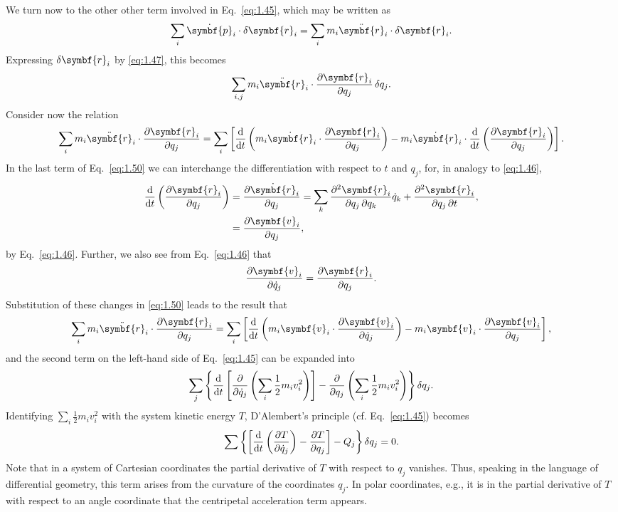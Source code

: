 We turn now to the other other term involved in Eq.~\eqref{eq:1.45}, which may be written as
\begin{equation*}
    \sum_i\dot{\symbf{p}}_i\cdot\fdif{\symbf{r}_i}=\sum_im_i\ddot{\symbf{r}}_i\cdot\fdif{\symbf{r}_i}.
\end{equation*}
Expressing \(\fdif{\symbf{r}_i}\) by \eqref{eq:1.47}, this becomes
\begin{equation*}
    \sum_{i,j}m_i\ddot{\symbf{r}}_i\cdot\pdv{\symbf{r}_i}{q_j}\fdif{q_j}.
\end{equation*}
Consider now the relation
\begin{equation}
    \sum_im_i\ddot{\symbf{r}}_i\cdot\pdv{\symbf{r}_i}{q_j}=\sum_i\left[\odv*{\left(m_i\dot{\symbf{r}}_i\cdot\pdv{\symbf{r}_i}{q_j}\right)}{t}-m_i\dot{\symbf{r}}_i\cdot\odv*{\left(\pdv{\symbf{r}_i}{q_j}\right)}{t}\right].\label{eq:1.50}
\end{equation}
In the last term of Eq.~\eqref{eq:1.50} we can interchange the differentiation with respect to \(t\) and \(q_j\), for, in analogy to \eqref{eq:1.46},
\begin{equation*}
    \begin{aligned}
        \odv*{\left(\pdv{\symbf{r}_i}{q_j}\right)}{t}&=\pdv{\dot{\symbf{r}}_i}{q_j}=\sum_k\pdv{\symbf{r}_i}{q_j,q_k}\dot{q}_k+\pdv{\symbf{r}_i}{q_j,t},\\
        &=\pdv{\symbf{v}_i}{q_j},
    \end{aligned}
\end{equation*}
by Eq.~\eqref{eq:1.46}. Further, we also see from Eq.~\eqref{eq:1.46} that
\begin{equation}
    \pdv{\symbf{v}_i}{\dot{q}_j}=\pdv{\symbf{r}_i}{q_j}.
\end{equation}
Substitution of these changes in \eqref{eq:1.50} leads to the result that
\begin{equation*}
    \sum_im_i\ddot{\symbf{r}}_i\cdot\pdv{\symbf{r}_i}{q_j}=\sum_i\left[\odv*{\left(m_i\symbf{v}_i\cdot\pdv{\symbf{v}_i}{\dot{q}_j}\right)}{t}-m_i\symbf{v}_i\cdot\pdv{\symbf{v}_i}{q_j}\right],
\end{equation*}
and the second term on the left-hand side of Eq.~\eqref{eq:1.45} can be expanded into
\begin{equation*}
    \sum_j\left\{\odv*{\left[\pdv*{\left(\sum_i\frac{1}{2}m_iv_i^2\right)}{\dot{q}_j}\right]}{t}-\pdv*{\left(\sum_i\frac{1}{2}m_iv_i^2\right)}{q_j}\right\}\fdif{q_j}.
\end{equation*}
Identifying \(\sum_i\frac{1}{2}m_iv_i^2\) with the system kinetic energy \(T\), D'Alembert's principle (cf. Eq.~\eqref{eq:1.45}) becomes
\begin{equation}
    \sum\left\{\left[\odv*{\left(\pdv{T}{\dot{q}_j}\right)}{t}-\pdv{T}{q_j}\right]-Q_j\right\}\fdif{q_j}=0.\label{eq:1.52}
\end{equation}
Note that in a system of Cartesian coordinates the partial derivative of \(T\) with respect to \(q_j\) vanishes. Thus, speaking in the language of differential geometry, this term arises from the curvature of the coordinates \(q_j\). In polar coordinates, e.g., it is in the partial derivative of \(T\) with respect to an angle coordinate that the centripetal acceleration term appears.

